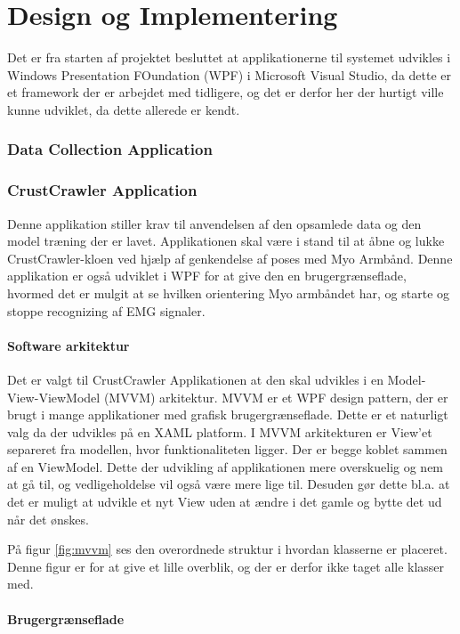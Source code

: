 \thispagestyle{fancy}
\chapter{Design og Implementering}
\label{chp:designogimpl}

Det er fra starten af projektet besluttet at applikationerne til systemet udvikles i Windows Presentation FOundation (WPF) i Microsoft Visual Studio, da dette er et framework der er arbejdet med tidligere, og det er derfor her der hurtigt ville kunne udviklet, da dette allerede er kendt.

\subsection{Data Collection Application}
\label{sec:datacoll}

\subsection{CrustCrawler Application}
\label{sec:ccapp}

Denne applikation stiller krav til anvendelsen af den opsamlede data og den model træning der er lavet. Applikationen skal være i stand til at åbne og lukke CrustCrawler-kloen ved hjælp af genkendelse af poses med Myo Armbånd. Denne applikation er også udviklet i WPF for at give den en brugergrænseflade, hvormed det er mulgit at se hvilken orientering Myo armbåndet har, og starte og stoppe recognizing af EMG signaler.

\subsubsection{Software arkitektur}
Det er valgt til CrustCrawler Applikationen at den skal udvikles i en Model-View-ViewModel (MVVM) arkitektur. MVVM er et WPF design pattern, der er brugt i mange applikationer med grafisk brugergrænseflade. Dette er et naturligt valg da der udvikles på en XAML platform. I MVVM arkitekturen er View'et separeret fra modellen, hvor funktionaliteten ligger. Der er begge koblet sammen af en ViewModel. Dette der udvikling af applikationen mere overskuelig og nem at gå til, og vedligeholdelse vil også være mere lige til. Desuden gør dette bl.a. at det er muligt at udvikle et nyt View uden at ændre i det gamle og bytte det ud når det ønskes.\\


På figur \ref{fig:mvvm} ses den overordnede struktur i hvordan klasserne er placeret. Denne figur er for at give et lille overblik, og der er derfor ikke taget alle klasser med.

\subsubsection{Brugergrænseflade}